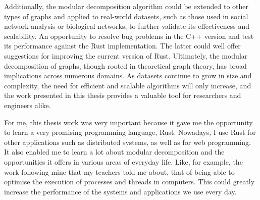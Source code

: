 Additionally, the modular decomposition algorithm could be extended to other types of graphs and applied to real-world datasets, such as those used in social network analysis or biological networks, to further validate its effectiveness and scalability.
An opportunity to resolve bug problems in the C++ version and test its performance against the Rust implementation.
The latter could well offer suggestions for improving the current version of Rust.
Ultimately, the modular decomposition of graphs, though rooted in theoretical graph theory, has broad implications across numerous domains.
As datasets continue to grow in size and complexity, the need for efficient and scalable algorithms will only increase, and the work presented in this thesis provides a valuable tool for researchers and engineers alike.

For me, this thesis work was very important because it gave me the opportunity to learn a very promising programming language, Rust.
Nowadays, I use Rust for other applications such as distributed systems, as well as for web programming.
It also enabled me to learn a lot about modular decomposition and the opportunities it offers in various areas of everyday life.
Like, for example, the work following mine that my teachers told me about, that of being able to optimise the execution of processes and threads in computers.
This could greatly increase the performance of the systems and applications we use every day.



